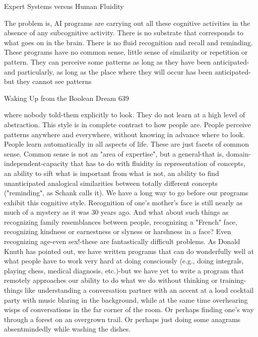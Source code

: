                      Expert Systems versus Human Fluidity

        The problem is, AI programs are carrying out all these cognitive activities in
the absence of any subcognitive activity. There is no substrate that corresponds to
what goes on in the brain. There is no fluid recognition and recall and reminding.
These programs have no common sense, little sense of similarity or repetition or
pattern. They can perceive some patterns as long as they have been anticipated-and
particularly, as long as the place where they will occur has been anticipated-but they
cannot see patterns




Waking Up from the Boolean Dream                                                   639

where nobody told-them explicitly to look. They do not learn at a high level of
abstraction.
        This style is in complete contrast to how people are. People perceive patterns
anywhere and everywhere, without knowing in advance where to look. People learn
automatically in all aspects of life. These are just facets of common sense. Common
sense is not an "area of expertise", but a general-that is, domain-independent-capacity
that has to do with fluidity in representation of concepts, an ability to sift what is
important from what is not, an ability to find unanticipated analogical similarities
between totally different concepts ("reminding", as Schank calls it). We have a long
way to go before our programs exhibit this cognitive style.
        Recognition of one's mother's face is still nearly as much of a mystery as it
was 30 years ago. And what about such things as recognizing family resemblances
between people, recognizing a "French" face, recognizing kindness or earnestness or
slyness or harshness in a face? Even recognizing age-even sex!-these are fantastically
difficult problems. As Donald Knuth has pointed out, we have written programs that
can do wonderfully well at what people have to work very hard at doing consciously
(e.g., doing integrals, playing chess, medical diagnosis, etc.)-but we have yet to write
a program that remotely approaches our ability to do what we do without thinking or
training-things like understanding a conversation partner with an accent at a loud
cocktail party with music blaring in the background, while at the same time
overhearing wisps of conversations in the far corner of the room. Or perhaps finding
one's way through a forest on an overgrown trail. Or perhaps just doing some
anagrams absentmindedly while washing the dishes.
